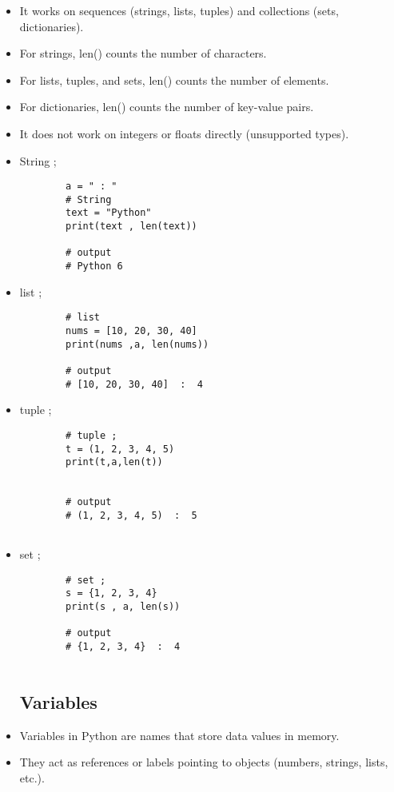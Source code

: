 \documentclass[a4paper,11pt]{article}
\theoremstyle{mytheor}
\begin{document}
\begin{itemize}
	\item It works on sequences (strings, lists, tuples) and collections (sets, dictionaries).
	
	\item For strings, len() counts the number of characters.
	
	\item For lists, tuples, and sets, len() counts the number of elements.
	
	\item For dictionaries, len() counts the number of key-value pairs.
	
	\item It does not work on integers or floats directly (unsupported types).
	
	\item String ;
	\begin{lstlisting}
		a = " : "
		# String
		text = "Python"
		print(text , len(text))
		
		# output
		# Python 6
	\end{lstlisting}
	
	\item list ;
	\begin{lstlisting}
		# list
		nums = [10, 20, 30, 40]
		print(nums ,a, len(nums))
		
		# output
		# [10, 20, 30, 40]  :  4
	\end{lstlisting}
	\item tuple ;
	\begin{lstlisting}
		# tuple ;
		t = (1, 2, 3, 4, 5)
		print(t,a,len(t))
		
		
		# output
		# (1, 2, 3, 4, 5)  :  5
		
	\end{lstlisting}
	\item set ;
	\begin{lstlisting}
		# set ;
		s = {1, 2, 3, 4}
		print(s , a, len(s))
		
		# output
		# {1, 2, 3, 4}  :  4
		
	\end{lstlisting}
	
	\subsection{Variables}
	\item Variables in Python are names that store data values in memory.
	
	\item They act as references or labels pointing to objects (numbers, strings, lists, etc.).
	

\end{itemize}
\end{document}
